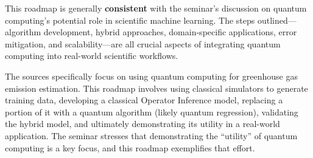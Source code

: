 \documentclass[
]{article}
\begin{document}
\begin{itemize}
  This roadmap is generally \textbf{consistent} with the seminar's
  discussion on quantum computing's potential role in scientific machine
  learning. The steps outlined---algorithm development, hybrid
  approaches, domain-specific applications, error mitigation, and
  scalability---are all crucial aspects of integrating quantum computing
  into real-world scientific workflows.

  The sources specifically focus on using quantum computing for
  greenhouse gas emission estimation. This roadmap involves using
  classical simulators to generate training data, developing a classical
  Operator Inference model, replacing a portion of it with a quantum
  algorithm (likely quantum regression), validating the hybrid model,
  and ultimately demonstrating its utility in a real-world application.
  The seminar stresses that demonstrating the ``utility'' of quantum
  computing is a key focus, and this roadmap exemplifies that effort.
\end{itemize}
\end{document}
